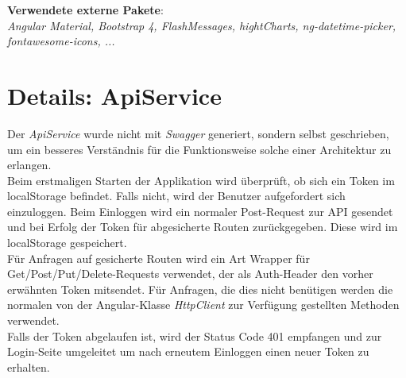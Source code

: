 \documentclass[12pt, letterpaper]{article}
\begin{document}
\textbf{Verwendete externe Pakete}:\\
\textit{Angular Material, Bootstrap 4, FlashMessages, hightCharts, ng-datetime-picker, fontawesome-icons, ...}


\newpage

\section{Details: ApiService}
\label{components}

Der \textit{ApiService} wurde nicht mit \textit{Swagger} generiert, sondern selbst geschrieben, um ein besseres Verständnis für die Funktionsweise solche einer Architektur zu erlangen.\\

Beim erstmaligen Starten der Applikation wird überprüft, ob sich ein Token im localStorage befindet. Falls nicht, wird der Benutzer aufgefordert sich einzuloggen. Beim Einloggen wird ein normaler Post-Request zur API gesendet und bei Erfolg der Token für abgesicherte Routen zurückgegeben. Diese wird im localStorage gespeichert.\\

Für Anfragen auf gesicherte Routen wird ein Art Wrapper für Get/Post/Put/Delete-Requests verwendet, der als Auth-Header den vorher erwähnten Token mitsendet. Für Anfragen, die dies nicht benütigen werden die normalen von der Angular-Klasse \textit{HttpClient} zur Verfügung gestellten Methoden verwendet.\\

Falls der Token abgelaufen ist, wird der Status Code 401 empfangen und zur Login-Seite umgeleitet um nach erneutem Einloggen einen neuer Token zu erhalten.\\
\end{document}
